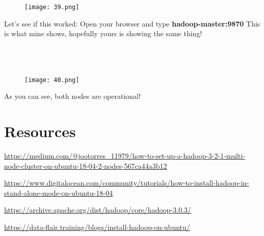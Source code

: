 \documentclass[onecolumn]{article}
\begin{document}
\begin{figure}[ht!]
\centering
\texttt{[image: 39.png]}
\caption{\label{}}
\end{figure}


Let’s see if this worked:
Open your browser and type \textbf{hadoop-master:9870}
This is what mine shows, hopefully yours is showing the same thing!\\\\\\\\


\begin{figure}[ht!]
\centering
\texttt{[image: 40.png]}
\caption{\label{}}
\end{figure}


As you can see, both nodes are operational!






\section{Resources}


\url{https://medium.com/@jootorres_11979/how-to-set-up-a-hadoop-3-2-1-multi-node-cluster-on-ubuntu-18-04-2-nodes-567ca44a3b12}

\url{https://www.digitalocean.com/community/tutorials/how-to-install-hadoop-in-stand-alone-mode-on-ubuntu-18-04}

\url{https://archive.apache.org/dist/hadoop/core/hadoop-3.0.3/}

\url{https://data-flair.training/blogs/install-hadoop-on-ubuntu/}
\end{document}
